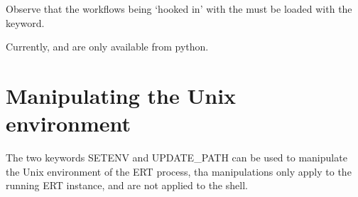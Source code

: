 \documentclass[letterpaper,10pt,english]{sphinxmanual}
\begin{document}
Observe that the workflows being ‘hooked in’ with the  must
be loaded with the  keyword.

Currently,  and  are only available from
python.


\section{Manipulating the Unix environment}
\label{\detokenize{keywords/index:manipulating-the-unix-environment}}\label{\detokenize{keywords/index:id17}}
The two keywords SETENV and UPDATE\_PATH can be used to manipulate the Unix
environment of the ERT process, tha manipulations only apply to the running ERT
instance, and are not applied to the shell.
\end{document}
